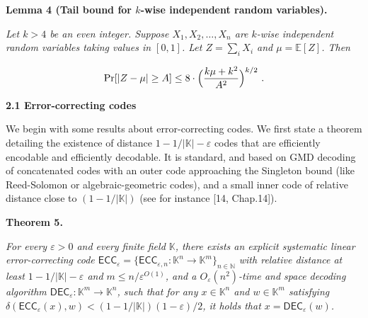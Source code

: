 \documentclass[10pt,a4paper]{article}
\begin{document}
\par\medskip\noindent\textbf{
\textbf{Lemma 4}\textbf{ }(Tail bound for $k$-wise independent random variables)\textbf{.}
}\par



\emph{Let $k>4$ be an even integer. Suppose
$X_{1},X_{2},\dots,X_{n}$ are $k$-wise independent
random variables taking values in $[0,1]$. Let $Z=\sum_{i}X_{i}$ and $\mu={\mathbb{E}}[Z]$. Then}\par


\[\begin{gathered}
\mathrm{Pr}[|Z-\mu|\geq A]\leq 8\cdot\Bigl{(}\frac{k\mu+k^{2}}{A^{2}}\Bigr{)}^{k/2}\ .
\end{gathered}\]







\par\medskip\noindent\textbf{
2.1 Error-correcting codes}\par




We begin with some results about error-correcting codes. We first state a theorem detailing the existence of distance $1-1/|\mathbb{K}|-\varepsilon$ codes that are efficiently encodable and efficiently decodable. It is standard, and based on GMD decoding of concatenated codes with an outer code approaching the Singleton bound (like Reed-Solomon or algebraic-geometric codes), and a small inner code of relative distance close to $(1-1/|\mathbb{K}|)$ (see for instance [14, Chap.14]).\par





\par\medskip\noindent\textbf{
\textbf{Theorem 5}\textbf{.}
}\par



\emph{For every $\varepsilon>0$ and every finite field $\mathbb{K}$, there exists an explicit systematic linear error-correcting code $\mathsf{ECC}_{\varepsilon}=\{\mathsf{ECC}_{\varepsilon,n}:\mathbb{K}^{n}\rightarrow\mathbb{K}^{m}\}_{n\in\mathbb{N}}$ with relative distance at least $1-1/|\mathbb{K}|-\varepsilon$ and $m\leq n/\varepsilon^{O(1)}$, and a $O_{\varepsilon}(n^{2})$-time and space decoding algorithm $\mathsf{DEC}_{\varepsilon}:\mathbb{K}^{m}\rightarrow\mathbb{K}^{n}$, such that for any $x\in\mathbb{K}^{n}$ and $w\in\mathbb{K}^{m}$ satisfying $\delta(\mathsf{ECC}_{\varepsilon}(x),w)<(1-1/|\mathbb{K}|)(1-\varepsilon)/2$, it holds that $x=\mathsf{DEC}_{\varepsilon}(w)$.}\par
\end{document}
